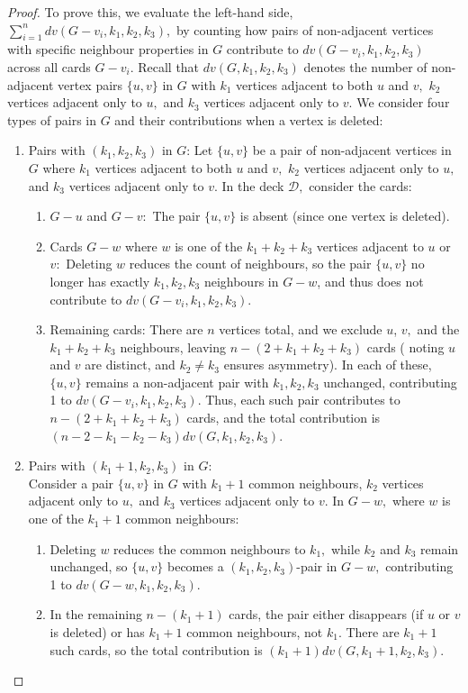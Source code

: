 \documentclass[10pt,a4paper]{amsart}
\begin{document}
\begin{proof}
To prove this, we evaluate the left-hand side, $\sum_{i=1}^{n}{dv(G-v_i,k_1,k_2,k_3)},$ by counting how pairs of non-adjacent vertices with specific neighbour properties in $G$ contribute to $dv(G-v_i,k_1,k_2,k_3)$ across all cards $G-v_i.$ Recall that $dv(G,k_1,k_2,k_3)$ denotes the number of non-adjacent vertex pairs $\{u,v\}$ in $G$  with $k_1$ vertices adjacent to both $u$ and $v,$ $k_2$ vertices adjacent only to $u,$ and $k_3$ vertices adjacent only to $v.$ We consider four types of pairs in $G$ and their contributions when a vertex is deleted:
\begin{enumerate}
\item[(1)] Pairs with $(k_1,k_2,k_3)$ in $G$:
 Let $\{u,v\}$ be a pair of non-adjacent vertices in $G$ where $k_1$ vertices adjacent to both $u$ and $v,$ $k_2$ vertices adjacent only to $u,$ and $k_3$ vertices adjacent only to $v.$ In the deck $\mathscr{D},$ consider the cards:

\begin{enumerate}
\item[{\bf \LARGE .}] $G-u$ and $G-v:$ The pair  $\{u,v\}$ is absent (since one vertex is deleted).
\item[{\bf \LARGE .}] Cards $G-w$ where $w$ is one of the $k_1+k_2+k_3$  vertices adjacent to $u$ or $v:$ Deleting $w$ reduces the count of neighbours, so the pair $\{u,v\}$ no longer has exactly $k_1,k_2,k_3$ neighbours in $G-w$, and thus does not contribute to $dv(G-v_i,k_1,k_2,k_3)$. 
\item[{\bf \LARGE .}] Remaining cards: There are $n$ vertices total, and we exclude $u$, $v,$ and the $k_1+k_2+k_3$ neighbours, leaving $n-(2+k_1+k_2+k_3)$ cards ( noting $u$ and $v$ are distinct, and $k_2 \neq k_3$ ensures asymmetry). In each of these, $\{u,v\}$ remains a non-adjacent pair with $k_1,k_2,k_3$ unchanged, contributing 1 to $dv(G-v_i,k_1,k_2,k_3)$. Thus, each such pair contributes to $n-(2+k_1+k_2+k_3)$ cards, and the total contribution is $(n-2-k_1-k_2-k_3)dv(G,k_1,k_2,k_3).$
\end{enumerate}
\item[(2)] Pairs with $(k_1+1,k_2,k_3)$ in $G$:\\
Consider a pair $\{u,v\}$ in $G$ with $k_1+1$ common neighbours, $k_2$ vertices adjacent only to $u,$ and $k_3$ vertices adjacent only to $v.$ In $G-w,$ where $w$ is one of the $k_1+1$ common neighbours:
\begin{enumerate}
\item[{\bf \LARGE .}] Deleting $w$ reduces the common neighbours to $k_1,$ while $k_2$ and $k_3$ remain unchanged, so $\{u,v\}$ becomes a $(k_1,k_2,k_3)$-pair in $G-w,$ contributing 1 to $dv(G-w,k_1,k_2,k_3).$
\item[{\bf \LARGE .}] In the remaining $n-(k_1+1)$ cards, the pair either disappears (if $u$ or $v$ is deleted) or has $k_1+1$ common neighbours, not $k_1.$ There are $k_1+1$ such cards, so the total contribution is $(k_1+1)dv(G, k_1+1,k_2,k_3).$
\end{enumerate}


\end{enumerate}
\end{proof}
\end{document}
